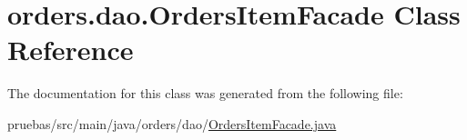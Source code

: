 \hypertarget{classorders_1_1dao_1_1_orders_item_facade}{}\section{orders.\+dao.\+Orders\+Item\+Facade Class Reference}
\label{classorders_1_1dao_1_1_orders_item_facade}


The documentation for this class was generated from the following file\+:\begin{DoxyCompactItemize}
\item 
pruebas/src/main/java/orders/dao/\mbox{\hyperlink{_orders_item_facade_8java}{Orders\+Item\+Facade.\+java}}\end{DoxyCompactItemize}
